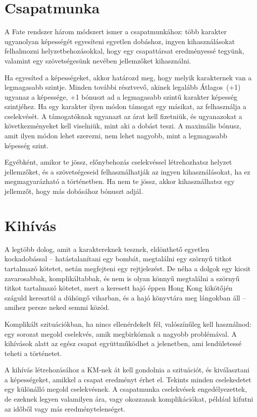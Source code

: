 \section{Csapatmunka}

A Fate rendszer három módszert ismer a csapatmunkához: több karakter ugyanolyan képességét egyesíteni egyetlen dobáshoz, ingyen kihasználásokat felhalmozni helyzetbehozásokkal, hogy egy csapattársat eredményessé tegyünk, valamint egy szövetségesünk nevében jellemzőket kihasználni.

Ha egyesíted a képességeket, akkor határozd meg, hogy melyik karakternek van a legmagasabb szintje. Minden további résztvevő, akinek legalább Átlagos~(+1) ugyanaz a képessége, +1 bónuszt ad a legmagasabb szintű karakter képesség szintjéhez. Ha egy karakter ilyen módon támogat egy másikat, az felhasználja a cselekvését. A támogatóknak ugyanazt az árat kell fizetniük, és ugyanazokat a következményeket kell viselniük, mint aki a dobást teszi. A maximális bónusz, amit ilyen módon lehet szerezni, nem lehet nagyobb, mint a legmagasabb képesség szint.

Egyébként, amikor te jössz, előnybehozás cselekvéssel létrehozhatsz helyzet jellemzőket, és a szövetségeseid felhasználhatják az ingyen kihasználásokat, ha ez megmagyarázható a történetben. Ha nem te jössz, akkor kihasználhatsz egy jellemzőt, hogy más dobásához bónuszt adjál.

\section{Kihívás}

A legtöbb dolog, amit a karaktereknek tesznek, eldönthető egyetlen kockadobással – hatástalanítani egy bombát, megtalálni egy szörnyű titkot tartalmazó kötetet, netán megfejteni egy rejtjelezést. De néha a dolgok egy kicsit zavarosabbak, komplikáltabbak, és nem is olyan könnyű megtalálni a szörnyű titkot tartalmazó kötetet, mert a keresett hajó éppen Hong Kong kikötőjén száguld keresztül a dühöngő viharban, és a hajó könyvtára meg lángokban áll – amihez persze neked semmi közöd.

Komplikált szituációkban, ha nincs ellenérdekelt fél, valószínűleg  kell használnod: egy sorozat megold cselekvés, amik megbirkóznak a nagyobb problémával. A kihívások alatt az egész csapat együttműködhet a jelenetben, ami lendületessé teheti a történetet.

A kihívás létrehozásához a KM‑nek át kell gondolnia a szituációt, és kiválasztani a képességeket, amikkel a csapat eredményt érhet el. Tekints minden cselekedetet egy különálló megold cselekvésnek. A csapatmunka cselekvések engedélyezettek, de ezeknek legyen valamilyen ára, vagy okozzanak komplikációkat, például kifutni az időből vagy más eredménytelenséget.

